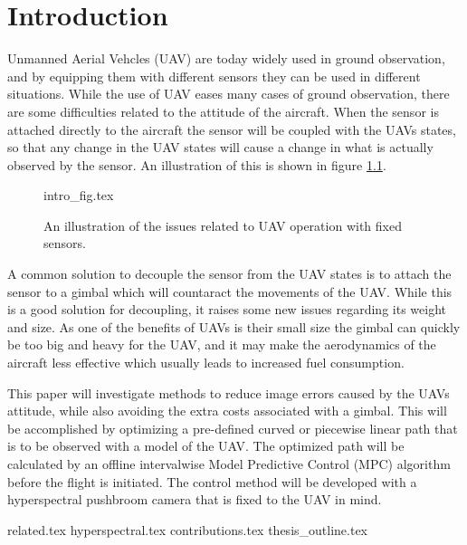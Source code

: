 \chapter{Introduction}

Unmanned Aerial Vehcles (UAV) are today widely used in ground observation, and by equipping them with different sensors they can be used in different situations. While the use of UAV eases many cases of ground observation, there are some difficulties related to the attitude of the aircraft. When the sensor is attached directly to the aircraft the sensor will be coupled with the UAVs states, so that any change in the UAV states will cause a change in what is actually observed by the sensor. An illustration of this is shown in figure \ref{fig:intro_fig}.

\begin{figure}
	{intro_fig.tex}
	\caption{An illustration of the issues related to UAV operation with fixed sensors.}
	\label{fig:intro_fig}
\end{figure}

A common solution to decouple the sensor from the UAV states is to attach the sensor to a gimbal which will countaract the movements of the UAV. While this is a good solution for decoupling, it raises some new issues regarding its weight and size. As one of the benefits of UAVs is their small size the gimbal can quickly be too big and heavy for the UAV, and it may make the aerodynamics of the aircraft less effective which usually leads to increased fuel consumption.

This paper will investigate methods to reduce image errors caused by the UAVs attitude, while also avoiding the extra costs associated with a gimbal. This will be accomplished by optimizing a pre-defined curved or piecewise linear path that is to be observed with a model of the UAV. The optimized path will be calculated by an offline intervalwise Model Predictive Control (MPC) algorithm before the flight is initiated. The control method will be developed with a hyperspectral pushbroom camera that is fixed to the UAV in mind.


{related.tex}
{hyperspectral.tex}
{contributions.tex}
{thesis_outline.tex}